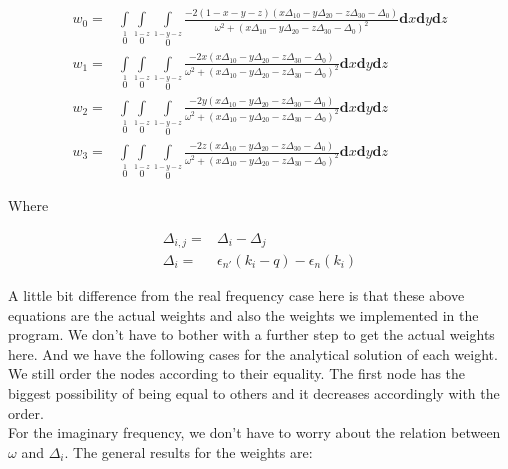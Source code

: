 \documentclass[10pt]{article}
\begin{document}
\begin{subequations}\label{wtidif}
\begin{align}
{w}_{0}=&\int\limits_0\limits^1\int\limits_0\limits^{1-z}\int\limits_0\limits^{1-y-z}\frac{-2(1-x-y-z)(x\Delta_{10}-y\Delta_{20}-z\Delta_{30}-\Delta_{0})}{\omega^2+(x\Delta_{10}-y\Delta_{20}-z\Delta_{30}-\Delta_{0})^2}\textbf{d}x\textbf{d}y\textbf{d}z\\
{w}_{1}=&\int\limits_0\limits^1\int\limits_0\limits^{1-z}\int\limits_0\limits^{1-y-z}\frac{-2x(x\Delta_{10}-y\Delta_{20}-z\Delta_{30}-\Delta_{0})}{\omega^2+(x\Delta_{10}-y\Delta_{20}-z\Delta_{30}-\Delta_{0})^2}\textbf{d}x\textbf{d}y\textbf{d}z\\
{w}_{2}=&\int\limits_0\limits^1\int\limits_0\limits^{1-z}\int\limits_0\limits^{1-y-z}\frac{-2y(x\Delta_{10}-y\Delta_{20}-z\Delta_{30}-\Delta_{0})}{\omega^2+(x\Delta_{10}-y\Delta_{20}-z\Delta_{30}-\Delta_{0})^2}\textbf{d}x\textbf{d}y\textbf{d}z\\
{w}_{3}=&\int\limits_0\limits^1\int\limits_0\limits^{1-z}\int\limits_0\limits^{1-y-z}\frac{-2z(x\Delta_{10}-y\Delta_{20}-z\Delta_{30}-\Delta_{0})}{\omega^2+(x\Delta_{10}-y\Delta_{20}-z\Delta_{30}-\Delta_{0})^2}\textbf{d}x\textbf{d}y\textbf{d}z
\end{align}
\end{subequations}

Where 

\begin{subequations}\label{wtidif2}
\begin{align}
\Delta_{i,j}=&\Delta_{i}-\Delta_{j}\\
\Delta_{i}=&\epsilon_{n'}(k_i-q)-\epsilon_{n}(k_i)
\end{align}
\end{subequations}

A little bit difference from the real frequency case here is that these above equations are the actual weights and also the weights we implemented in the program. We don't have to bother with a further step to get the actual weights here. And we have the following cases for the analytical solution of each weight. We still order the 
nodes according to their equality. The first node has the biggest possibility of being equal to others and it decreases accordingly with the order.\\

For the imaginary frequency, we don't have to worry about the relation between $\omega$ and $\Delta_i$. The general results for the weights are:
\end{document}

